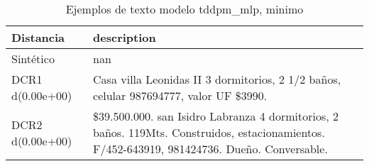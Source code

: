 \begin{table}[H]
\centering
\fontsize{10}{14}\selectfont
\caption{Ejemplos de texto modelo tddpm\_mlp, minimo}
\label{table-example-economicos-b-2-tddpm_mlp-min-text}
\begin{tabular}{|l|m{35em}|}
\hline
\rowcolor[gray]{0.8}
Distancia & description \\
\hline Sintético & nan \\
\hline DCR1 d(0.00e+00) & Casa villa Leonidas II 3 dormitorios, 2 1/2 ba\~nos, celular 987694777, valor UF \$3990. \\
\hline DCR2 d(0.00e+00) & \$39.500.000. san Isidro Labranza 4 dormitorios, 2 ba\~nos. 119Mts. Construidos, estacionamientos. F/452-643919, 981424736. Due\~no. Conversable. \\
\hline
\end{tabular}
\end{table}
